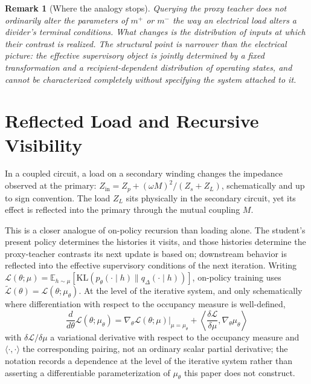 \documentclass[11pt]{article}
\newtheorem{remark}[definition]{Remark}
\begin{document}
\begin{remark}[Where the analogy stops]
Querying the proxy teacher does not ordinarily alter the parameters of $m^{+}$ or $m^{-}$ the way an electrical load alters a divider's terminal conditions. What changes is the distribution of inputs at which their contrast is realized. The structural point is narrower than the electrical picture: the effective supervisory object is jointly determined by a fixed transformation and a recipient-dependent distribution of operating states, and cannot be characterized completely without specifying the system attached to it.
\end{remark}

\section{Reflected Load and Recursive Visibility}

In a coupled circuit, a load on a secondary winding changes the impedance observed at the primary: $Z_{\text{in}} = Z_p + (\omega M)^2/(Z_s + Z_L)$, schematically and up to sign convention. The load $Z_L$ sits physically in the secondary circuit, yet its effect is reflected into the primary through the mutual coupling $M$.

This is a closer analogue of on-policy recursion than loading alone. The student's present policy determines the histories it visits, and those histories determine the proxy-teacher contrasts its next update is based on; downstream behavior is reflected into the effective supervisory conditions of the next iteration. Writing $\mathcal{L}(\theta; \mu) = \mathbb{E}_{h \sim \mu}[\text{KL}(p_\theta(\cdot\mid h) \| q_\Delta(\cdot\mid h))]$, on-policy training uses $\widetilde{\mathcal{L}}(\theta) = \mathcal{L}(\theta; \mu_\theta)$. At the level of the iterative system, and only schematically where differentiation with respect to the occupancy measure is well-defined,
\[
\frac{d}{d\theta}\mathcal{L}(\theta; \mu_\theta) = \nabla_\theta \mathcal{L}(\theta; \mu)\Big|_{\mu = \mu_\theta} + \left\langle \frac{\delta \mathcal{L}}{\delta \mu}, \nabla_\theta \mu_\theta \right\rangle
\]
with $\delta\mathcal{L}/\delta\mu$ a variational derivative with respect to the occupancy measure and $\langle \cdot,\cdot\rangle$ the corresponding pairing, not an ordinary scalar partial derivative; the notation records a dependence at the level of the iterative system rather than asserting a differentiable parameterization of $\mu_\theta$ this paper does not construct.
\end{document}
